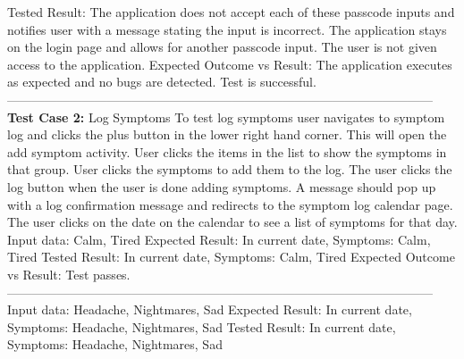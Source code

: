 \documentclass[letterpaper,12pt,titlepage]{article}
\begin{document}
\newline
\newline
Tested Result: The application does not accept each of these passcode inputs and notifies user with a message stating the input is incorrect. The application stays on the login page and allows for another passcode input. The user is not given access to the application.
\newline
\newline
Expected Outcome vs Result: The application executes as expected and no bugs are detected. Test is successful.
\newline
\newline
------------------------------------------------------------------------------------------------------
\noindent
\textbf{Test Case 2:} Log Symptoms
\newline
\newline
To test log symptoms user navigates to symptom log and clicks the plus button in the lower right hand corner. This will open the add symptom activity. User clicks the items in the list to show the symptoms in that group. User clicks the symptoms to add them to the log. The user clicks the log button when the user is done adding symptoms. A message should pop up with a log confirmation message and redirects to the symptom log calendar page. The user clicks on the date on the calendar to see a list of symptoms for that day.
\newline
\newline
Input data: Calm, Tired
\newline
\newline
Expected Result: In current date, Symptoms: Calm, Tired
\newline
\newline
Tested Result: In current date, Symptoms: Calm, Tired
\newline
\newline
Expected Outcome vs Result: Test passes.
\newline
\newline
------------------------------------------------------------------------------------------------------
\newline
Input data: Headache, Nightmares, Sad
\newline
\newline
Expected Result: In current date, Symptoms: Headache, Nightmares, Sad
\newline
\newline
Tested Result: In current date, Symptoms: Headache, Nightmares, Sad
\end{document}
